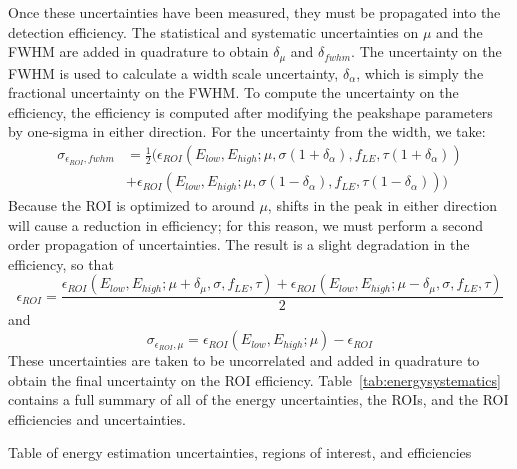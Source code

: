 \documentclass[/main.tex]{subfiles}
\begin{document}
Once these uncertainties have been measured, they must be propagated into the detection efficiency.
The statistical and systematic uncertainties on $\mu$ and the FWHM are added in quadrature to obtain $\delta_\mu$ and $\delta_{fwhm}$.
The uncertainty on the FWHM is used to calculate a width scale uncertainty, $\delta_\alpha$, which is simply the fractional uncertainty on the FWHM.
To compute the uncertainty on the efficiency, the efficiency is computed after modifying the peakshape parameters by one-sigma in either direction.
For the uncertainty from the width, we take:
\begin{equation}
  \begin{aligned}
    \sigma_{\epsilon_{ROI},fwhm} &= \frac{1}{2}\big(\epsilon_{ROI}(E_{low}, E_{high}; \mu, \sigma(1+\delta_\alpha), f_{LE}, \tau(1+\delta_\alpha)) \\&+ \epsilon_{ROI}(E_{low}, E_{high}; \mu, \sigma(1-\delta_\alpha), f_{LE}, \tau(1-\delta_\alpha))\big)
  \end{aligned}
\end{equation}
Because the ROI is optimized to around $\mu$, shifts in the peak in either direction will cause a reduction in efficiency; for this reason, we must perform a second order propagation of uncertainties.
The result is a slight degradation in the efficiency, so that
\begin{equation}
  \epsilon_{ROI} =  \frac{\epsilon_{ROI}(E_{low}, E_{high}; \mu + \delta_\mu, \sigma, f_{LE}, \tau) + \epsilon_{ROI}(E_{low}, E_{high}; \mu - \delta_\mu, \sigma, f_{LE}, \tau)}{2}
\end{equation}
and
\begin{equation}
  \sigma_{\epsilon_{ROI},\mu} = \epsilon_{ROI}(E_{low}, E_{high}; \mu) - \epsilon_{ROI}
\end{equation}
These uncertainties are taken to be uncorrelated and added in quadrature to obtain the final uncertainty on the ROI efficiency.
Table~\ref{tab:energysystematics} contains a full summary of all of the energy uncertainties, the ROIs, and the ROI efficiencies and uncertainties.
\begin{table}
  \caption[Energy systematics]{ \label{tab:energysystematics}
    Table of energy estimation uncertainties, regions of interest, and efficiencies
  }
  \resizebox{\textwidth}{!}{%
   }
\end{table}
\end{document}
